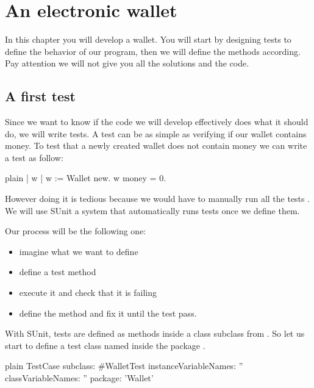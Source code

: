 \documentclass[10pt,twoside,english]{_support/latex/sbabook/sbabook}
\begin{document}
\frontmatter
\pagestyle{plain}

\tableofcontents*
\clearpage\listoffigures

\mainmatter

\chapter{An electronic wallet}\label{cha:wallet}
In this chapter you will develop a wallet. You will start by designing tests to define the behavior of our program, then we will define the methods according. Pay attention we will not give you all the solutions and the code.
\section{A first test}
Since we want to know if the code we will develop effectively does what it should do, we will write tests. 
A test can be as simple as verifying if our wallet contains money. To test that a newly created wallet does 
not contain money we can write a test as follow:

\begin{displaycode}{plain}
| w |
w := Wallet new.
w money = 0.
\end{displaycode}

However doing it is tedious because we would have to manually run all the tests . 
We will use SUnit a system that automatically runs tests once we define them. 

Our process will be the following one:

\begin{itemize}
\item imagine what we want to define
\item define a test method
\item execute it and check that it is failing
\item define the method and fix it until the test pass.
\end{itemize}

With SUnit, tests are defined as methods inside a class subclass from .
So let us start to define a test class named  inside the package .

\begin{displaycode}{plain}
TestCase subclass: #WalletTest
	instanceVariableNames: ''
	classVariableNames: ''
	package: 'Wallet'
\end{displaycode}
\end{document}
